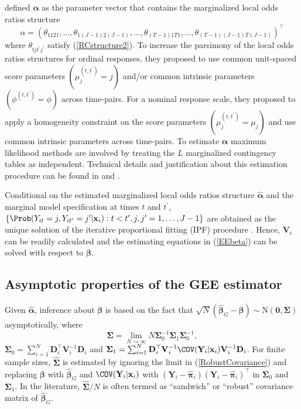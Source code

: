 \documentclass[article,shortnames,nojss]{jss}
\begin{document}
\cite{Touloumis2012} defined $\boldsymbol \alpha$ as the parameter vector that contains the marginalized local odds ratios structure
$$\alpha=\left(\theta_{1121},\ldots,\theta_{1(J-1)2(J-1)},\ldots,\theta_{(T-1)1T1},\ldots,\theta_{(T-1)(J-1)T(J-1)}\right)^{\top}$$
where $\theta_{tjt^{\prime}j^{\prime}}$ satisfy (\ref{RCstructure2}). To increase the parsimony of the local odds ratios structures for ordinal responses, they proposed to use common unit-spaced score parameters $\left(\mu^{(t,t^{\prime})}_{j}=j\right)$ and/or common intrinsic parameters $\left(\phi^{(t,t^{\prime})}=\phi\right)$ across time-pairs. For a nominal response scale, they proposed to apply a homogeneity constraint on the score parameters $\left(\mu^{(t,t^{\prime})}_{j}=\mu_{j}\right)$ and use common intrinsic parameters across time-pairs. To estimate $\boldsymbol \alpha$ maximum likelihood methods are involved by treating the $L$ marginalized contingency tables as independent. Technical details and justification about this estimation procedure can be found in \cite{Touloumis2011a} and \cite{Touloumis2012}.

Conditional on the estimated marginalized local odds ratios structure $\widehat{\boldsymbol \alpha}$ and the marginal model specification at times $t$ and $t^{\prime}$, $\{\Prob(Y_{it}=j,Y_{it^{\prime}}=j^{\prime}|\mathbf x_i):t<t^{\prime},j,j^{\prime}=1,\ldots,J-1\}$ are obtained as the unique solution of the iterative proportional fitting (IPF) procedure \citep{Deming1940}. Hence, $\mathbf V_i$ can be readily calculated and the estimating equations in (\ref{EEbeta}) can be solved with respect to $\boldsymbol \beta$. 

\subsection{Asymptotic properties of the GEE estimator}
Given $\widehat{\boldsymbol \alpha}$, inference about $\boldsymbol \beta$ is based on the fact that $\sqrt{N}(\boldsymbol {\widehat\beta}_G-\boldsymbol \beta)\sim \mathrm{N}(\mathbf 0,\boldsymbol {\Sigma})$ asymptotically,
where 
\begin{equation}
\boldsymbol {\Sigma}=\lim_{N\to\infty} N \boldsymbol {\Sigma}_0^{-1} \boldsymbol {\Sigma}_1 \boldsymbol {\Sigma}_0^{-1},
\label{RobustCovariance}
\end{equation}
$\boldsymbol {\Sigma}_0=\sum_{i=1}^N \mathbf{D}_i^{\top} \mathbf {V}^{-1}_{i} \mathbf{D}_i$ and $\boldsymbol {\Sigma}_1=\sum_{i=1}^N \mathbf{D}_i^{\top} \mathbf {V}^{-1}_{i} \COV(\mathbf{Y}_i|\mathbf x_i) \mathbf {V}^{-1}_{i} \mathbf{D}_i$. For finite sample sizes, $\widehat{\boldsymbol {\Sigma}}$ is estimated by ignoring the limit in (\ref{RobustCovariance}) and replacing $\boldsymbol \beta$ with $\boldsymbol {\widehat \beta}_G$ and $\COV(\mathbf{Y}_i|\mathbf x_i)$ with $(\mathbf {Y}_i-\widehat{\boldsymbol{\pi}}_i)(\mathbf {Y}_i-\widehat{\boldsymbol{\pi}}_i)^{\top}$ in $\boldsymbol {\Sigma}_0$ and $\boldsymbol {\Sigma}_1$. In the literature, $\widehat{\boldsymbol {\Sigma}}/N$ is often termed as ``sandwich'' or ``robust'' covariance matrix of $\boldsymbol {\widehat \beta}_G$.
\end{document}
